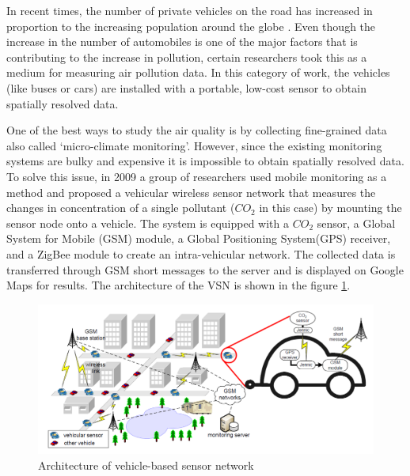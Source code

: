 In recent times, the number of private vehicles on the road has increased in proportion to the increasing population around the globe \cite{Downs2004}. Even though the increase in the number of automobiles is one of the major factors that is contributing to the increase in pollution, certain researchers took this as a medium for measuring air pollution data. In this category of work, the vehicles (like buses or cars) are installed with a portable, low-cost sensor to obtain spatially resolved data. 
\par
 One of the best ways to study the air quality is by collecting fine-grained data also called \lq{micro-climate monitoring}\rq. However, since the existing monitoring systems are bulky and expensive it is impossible to obtain spatially resolved data. To solve this issue, in 2009 a group of researchers used mobile monitoring as a method and proposed a vehicular wireless sensor network \cite{Hu2009} that measures the changes in concentration of a single pollutant ($CO_2$ in this case) by mounting the sensor node onto a vehicle. The system is equipped with a $CO_2$ sensor, a Global System for Mobile (GSM) module, a Global Positioning System(GPS) receiver, and a ZigBee module to create an intra-vehicular network. The collected data is transferred through GSM short messages to the server and is displayed on Google Maps for results. The architecture of the VSN is shown in the figure \ref{vsn}. 

 \begin{figure}[h!]
  \begin{center}
  \includegraphics[scale=0.65]{./images/figure40.png}
  \end{center}
 
  \caption{Architecture of vehicle-based sensor network \cite{Hu2009}}
  
  \label{vsn}
\end{figure}
 
